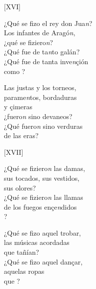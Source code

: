 \documentclass[11pt,a4paper,twoside]{article}
\begin{document}
\begin{center}
	[XVI]
\end{center}
\pstart
¿Qué se fizo el rey don Jua\textit{n}?\\
Los infantes de Aragó\textit{n},\\
¿qué se fiziero\textit{n}?\\
¿Qué fue de ta\textit{n}to galán?\\
¿Qué fue de tanta inve\textit{n}çión\\
como ?\par
Las justas y los torneos,\\
parame\textit{n}tos, bordaduras\\
y çimeras\\
¿fuero\textit{n} sino devaneos?\\
¿Qué fuero\textit{n} sino verduras\\
de las eras?\par
\pend

\begin{center}
	[XVII]
\end{center}
\pstart
¿Qué se fiziero\textit{n} las damas,\\
sus tocados, sus vestidos,\\
sus olores?\\
¿Qué se fiziero\textit{n} las llamas\\
de los fuegos ençe\textit{n}didos\\
?\par
¿Qué se fizo aquel trobar,\\
las músicas acordadas\\
que tañían?\\
¿Qué se fizo aquel dançar,\\
aquelas ropas \\
que ?\par
\pend
\end{document}

